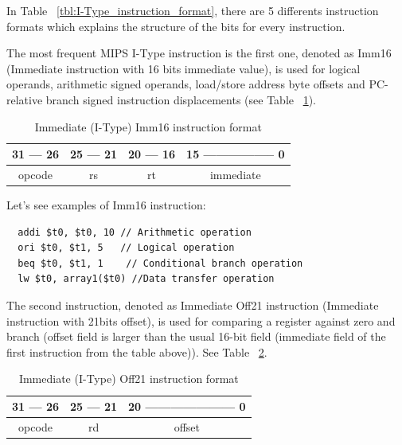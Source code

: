 \documentclass[
  oneside,
  11pt, a4paper,
  footinclude=true,
  headinclude=true,
  cleardoublepage=empty
]{scrbook}
\begin{document}
\newpage

In Table ~\ref{tbl:I-Type_instruction_format}, there are 5 differents instruction formats which explains the structure of the bits for every instruction.

The most frequent MIPS I-Type instruction is the first one, denoted as Imm16 (Immediate instruction with 16 bits immediate value), is used for logical operands, arithmetic signed operands, load/store address byte offsets and PC-relative branch signed instruction displacements (see Table ~\ref{tbl:imm16_instruction}).

\begin{table}[h!]
\centering
\begin{tabular}{l|l|l|l}
31 --- 26                    & 25 --- 21               & 20 --- 16               & 15 ----------------- 0         \\ \hline
\multicolumn{1}{|c|}{opcode} & \multicolumn{1}{c|}{rs} & \multicolumn{1}{c|}{rt} & \multicolumn{1}{c|}{immediate} \\ \hline
\end{tabular}
\caption{Immediate (I-Type) Imm16 instruction format}
\label{tbl:imm16_instruction}
\end{table}

Let's see examples of Imm16 instruction:

\begin{lstlisting}
  addi $t0, $t0, 10 // Arithmetic operation
  ori $t0, $t1, 5   // Logical operation
  beq $t0, $t1, 1    // Conditional branch operation
  lw $t0, array1($t0) //Data transfer operation
\end{lstlisting}

The second instruction, denoted as Immediate Off21 instruction (Immediate instruction with 21bits offset), is used for comparing a register against zero and branch (offset field is larger than the usual 16-bit field (immediate field of the first instruction from the table above)).
See Table ~\ref{tbl:imm_off21_instruction}.

\begin{table}[h!]
\centering
\begin{tabular}{l|l|l|l}
31 --- 26                    & 25 --- 21               & \multicolumn{2}{l}{20 --------------------- 0} \\ \hline
\multicolumn{1}{|c|}{opcode} & \multicolumn{1}{c|}{rd} & \multicolumn{2}{c|}{offset}                     \\ \hline
\end{tabular}
\caption{Immediate (I-Type) Off21 instruction format}
\label{tbl:imm_off21_instruction}
\end{table} 
\end{document}
